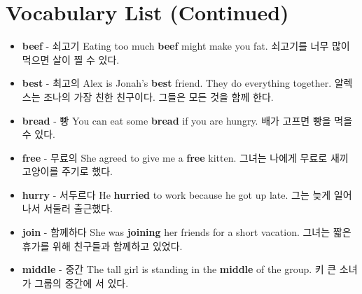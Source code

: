 \documentclass{article}
\begin{document}
\section*{Vocabulary List (Continued)}
\begin{addmargin}[1em]{1em}
    \begin{itemize}
        \item \fontsize{12pt}{14pt}\selectfont \textbf{beef} - 쇠고기 \newline
        Eating too much \textbf{beef} might make you fat. \newline
        쇠고기를 너무 많이 먹으면 살이 찔 수 있다.
        
        \item \fontsize{12pt}{14pt}\selectfont \textbf{best} - 최고의 \newline
        Alex is Jonah's \textbf{best} friend. They do everything together. \newline
        알렉스는 조나의 가장 친한 친구이다. 그들은 모든 것을 함께 한다.
        
        \item \fontsize{12pt}{14pt}\selectfont \textbf{bread} - 빵 \newline
        You can eat some \textbf{bread} if you are hungry. \newline
        배가 고프면 빵을 먹을 수 있다.
        
        \item \fontsize{12pt}{14pt}\selectfont \textbf{free} - 무료의 \newline
        She agreed to give me a \textbf{free} kitten. \newline
        그녀는 나에게 무료로 새끼 고양이를 주기로 했다.
        
        \item \fontsize{12pt}{14pt}\selectfont \textbf{hurry} - 서두르다 \newline
        He \textbf{hurried} to work because he got up late. \newline
        그는 늦게 일어나서 서둘러 출근했다.
        
        \item \fontsize{12pt}{14pt}\selectfont \textbf{join} - 함께하다 \newline
        She was \textbf{joining} her friends for a short vacation. \newline
        그녀는 짧은 휴가를 위해 친구들과 함께하고 있었다.
        
        \item \fontsize{12pt}{14pt}\selectfont \textbf{middle} - 중간 \newline
        The tall girl is standing in the \textbf{middle} of the group. \newline
        키 큰 소녀가 그룹의 중간에 서 있다.
        

\end{itemize}
\end{addmargin}
\end{document}
